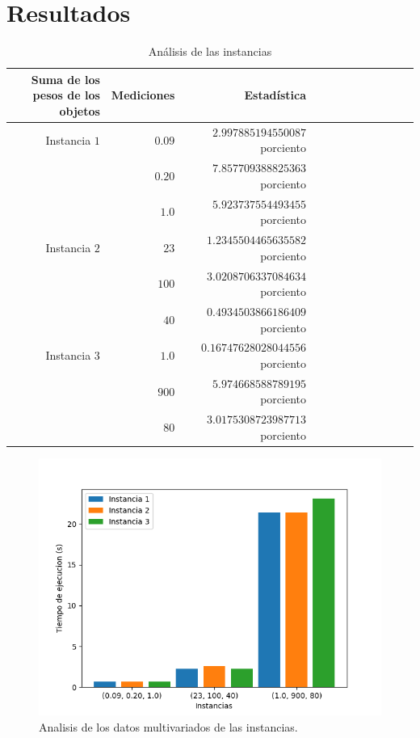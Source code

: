 \documentclass{article}
\begin{document}
\section{Resultados}\label{res}
\begin{table}[h!]
    \centering
    \caption{Análisis de las instancias}
        \begin{tabular}{|r|r|r|r||r|r||r|r|r|r||r|r|}
    \hline
       Suma de los pesos de los objetos & Mediciones & Estadística\\
       \hline\hline
       Instancia $1$ & $0.09$ & $2.997885194550087$ porciento \\
        \hline
         & $0.20$ & $7.857709388825363$ porciento \\
        \hline
         & $1.0$ & $5.923737554493455$ porciento \\
        \hline
        Instancia $2$ & $23$ & $1.2345504465635582$ porciento \\
        \hline
         & $100$ & $3.0208706337084634$ porciento\\
        \hline
         & $40$ & $0.4934503866186409$ porciento \\
        \hline
        Instancia $3$ & $1.0$ & $0.16747628028044556$ porciento \\
        \hline
         & $900$ & $5.974668588789195$ porciento \\
        \hline
         & $80$ & $3.0175308723987713$ porciento \\
        \hline
    \end{tabular}
    \label{medir_R}
\end{table}

\begin{figure}
    \centering
    \includegraphics[width=195mm]{Figure_1.png}
    \caption{Analisis de los datos multivariados de las instancias.}
    \label{figure}
\end{figure}
\end{document}
